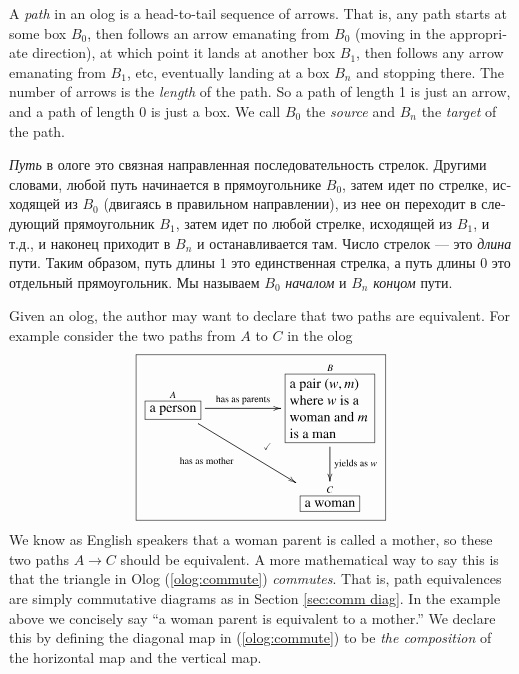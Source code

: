 \documentclass[a4paper]{book}
\def\tn{\textnormal}
\def\to{\rightarrow}
\def\rr{\raggedright}
\newcommand{\LA}[2]{\ar[#1]^-{\tn {#2}}}
\newcommand{\LAL}[2]{\ar[#1]_-{\tn {#2}}}
\newcommand{\obox}[3]{\stackrel{#1}{\fbox{\parbox{#2}{#3}}}}
\newcommand{\smbox}[2]{\stackrel{#1}{\fbox{#2}}}
\theoremstyle{myth}
\begin{document}
\begin{english}
A {\em path} in an olog is a head-to-tail sequence of arrows. That is, any path starts at some box $B_0$, then follows an arrow emanating from $B_0$ (moving in the appropriate direction), at which point it lands at another box $B_1$, then follows any arrow emanating from $B_1$, etc, eventually landing at a box $B_n$ and stopping there. The number of arrows is the {\em length} of the path. So a path of length 1 is just an arrow, and a path of length 0 is just a box. We call $B_0$ the {\em source} and $B_n$ the {\em target} of the path.

\begin{russian}{\em Путь} в ологе это связная направленная последовательность стрелок. Другими словами, любой путь начинается в прямоугольнике $B_0$, затем идет по стрелке, исходящей из $B_0$ (двигаясь в правильном направлении), из нее он переходит в следующий прямоугольник $B_1$, затем идет по любой стрелке, исходящей из $B_1$, и т.д., и наконец приходит в $B_n$ и останавливается там. Число стрелок — это {\em длина} пути. Таким образом, путь длины $1$ это единственная стрелка, а путь длины $0$ это отдельный прямоугольник. Мы называем $B_0$ {\em началом} и $B_n$ {\em концом} пути. \end{russian}

Given an olog, the author may want to declare that two paths are equivalent.  For example consider the two paths from $A$ to $C$ in the olog 
\begin{align}\label{olog:commute}\fbox{\xymatrixnocompile{\smbox{A}{a person}\LA{rr}{has as parents}\LAL{drr}{\parbox{.8in}{has as mother}}&&\obox{B}{.8in}{\rr a pair $(w,m)$ where $w$ is a woman and $m$ is a man}\ar@{}[dll]|(.4){\checkmark}\LA{d}{yields as $w$}\\&&\smbox{C}{a woman}}}\end{align}  We know as English speakers that a woman parent is called a mother, so these two paths $A\to C$ should be equivalent.  A more mathematical way to say this is that the triangle in Olog (\ref{olog:commute}) {\em commutes}. That is, path equivalences are simply commutative diagrams as in Section \ref{sec:comm diag}. In the example above we concisely say “a woman parent is equivalent to a mother.”  We declare this by defining the diagonal map in (\ref{olog:commute}) to be {\em the composition} of the horizontal map and the vertical map. 


\end{english}
\end{document}
